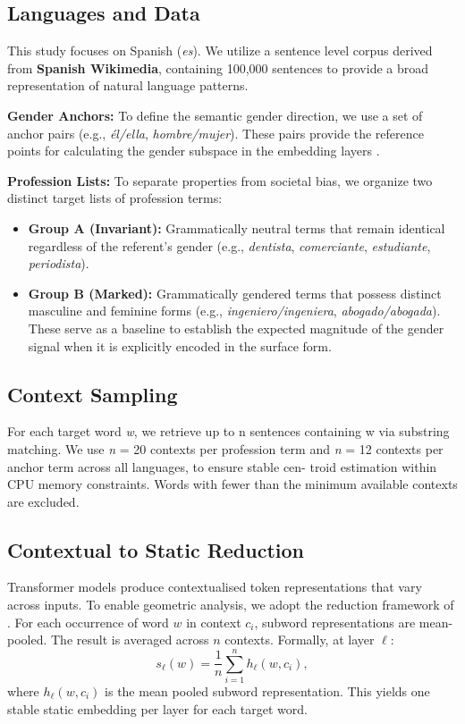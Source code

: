 \documentclass[english, a4paper, 11.5pt, twoside]{article}
\begin{document}
\subsection{Languages and Data}

This study focuses on Spanish (\textit{es}). We utilize a sentence level corpus derived from \textbf{Spanish Wikimedia}, containing 100,000 sentences to provide a broad representation of natural language patterns.

\textbf{Gender Anchors:} To define the semantic gender direction, we use a set of anchor pairs (e.g., \textit{él/ella}, \textit{hombre/mujer}). These pairs provide the reference points for calculating the gender subspace in the embedding layers \parencite{Bolukbasi:2016, Zhao:2019}.

\textbf{Profession Lists:} To separate properties from societal bias, we organize two distinct target lists of profession terms:
\begin{itemize}
    \item \textbf{Group A (Invariant):} Grammatically neutral terms that remain identical regardless of the referent's gender (e.g., \textit{dentista}, \textit{comerciante}, \textit{estudiante}, \textit{periodista}). 
    \item \textbf{Group B (Marked):} Grammatically gendered terms that possess distinct masculine and feminine forms (e.g., \textit{ingeniero/ingeniera}, \textit{abogado/abogada}). These serve as a baseline to establish the expected magnitude of the gender signal when it is explicitly encoded in the surface form.
\end{itemize}

\subsection{Context Sampling}
For each target word \textit{w}, we retrieve up to n sentences containing w via substring matching. We use \textit{n} = 20
contexts per profession term and \textit{n} = 12 contexts per anchor term across all languages, to ensure stable cen-
troid estimation within CPU memory constraints. Words with fewer than the minimum available contexts
are excluded.


\subsection{Contextual to Static Reduction}
Transformer models produce contextualised token representations that vary across inputs. To enable geometric analysis, we adopt the reduction framework of \cite{Bommasani:2020}. For each occurrence of word $w$ in context $c_i$, subword representations are mean-pooled. The result is averaged across $n$ contexts. Formally, at layer $\ell$:
\begin{equation}
\label{eq:reduction}
s_\ell(w) = \frac{1}{n}\sum_{i=1}^n h_\ell(w, c_i),
\end{equation}
where $h_\ell(w, c_i)$ is the mean pooled subword representation. This yields one stable static embedding per layer for each target word.
\end{document}
